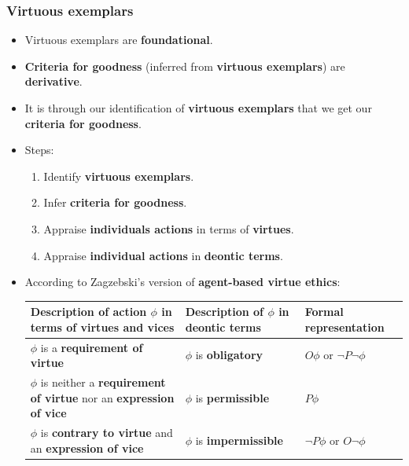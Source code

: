 \documentclass[11pt]{article}
\begin{document}
\subsubsection{Virtuous exemplars}
\label{sec:org8806750}
\begin{itemize}
\item Virtuous exemplars are \textbf{foundational}.
\item \textbf{Criteria for goodness} (inferred from \textbf{virtuous exemplars}) are \textbf{derivative}.
\item It is through our identification of \textbf{virtuous exemplars} that we get our \textbf{criteria for goodness}.
\item Steps:
\begin{enumerate}
\item Identify \textbf{virtuous exemplars}.
\item Infer \textbf{criteria for goodness}.
\item Appraise \textbf{individuals actions} in terms of \textbf{virtues}.
\item Appraise \textbf{individual actions} in \textbf{deontic terms}.
\end{enumerate}
\item According to Zagzebski's version of \textbf{agent-based virtue ethics}:

\begin{center}
\begin{tabularx}{\textwidth}{|X|X|X|}
\hline
Description of action \(\phi\) in terms of virtues and vices & Description of \(\phi\) in deontic terms & Formal representation\\
\hline
\(\phi\) is a \textbf{requirement of virtue} & \(\phi\) is \textbf{obligatory} & \(O \phi\) or \(\neg P \neg \phi\)\\
\hline
\(\phi\) is neither a \textbf{requirement of virtue} nor an \textbf{expression of vice} & \(\phi\) is \textbf{permissible} & \(P \phi\)\\
\hline
\(\phi\) is \textbf{contrary to virtue} and an \textbf{expression of vice} & \(\phi\) is \textbf{impermissible} & \(\neg P \phi\) or \(O \neg \phi\)\\
\hline
\end{tabularx}
\end{center}
\end{itemize}

 \newpage
\end{document}
